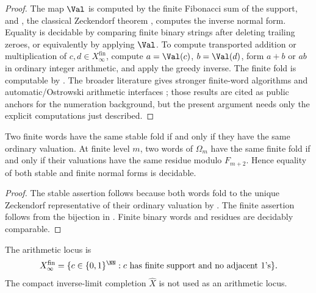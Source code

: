 \begin{proof}
The map \(\Val\) is computed by the finite Fibonacci sum of the support, and
, the classical Zeckendorf theorem
\cite{Zeckendorf1972}, computes the inverse normal form.  Equality is decidable
by comparing finite binary strings after deleting trailing zeroes, or
equivalently by applying \(\Val\).  To compute transported addition or
multiplication of \(c,d\in X_\infty^{\mathrm{fin}}\), compute
\(a=\Val(c)\), \(b=\Val(d)\), form \(a+b\) or \(ab\) in ordinary integer
arithmetic, and apply the greedy inverse.  The finite fold is computable by
.  The broader literature gives
stronger finite-word algorithms and automatic/Ostrowski arithmetic interfaces
\cite{AhlbachEtAl2013,HieronymiTerry2018}; those results are cited as public
anchors for the numeration background, but the present argument needs only the
explicit computations just described.
\end{proof}

\begin{proposition}
\label{prop:fold-confluence}
Two finite words have the same stable fold if and only if they have the same
ordinary valuation.  At finite level \(m\), two words of \(\Omega_m\) have the
same finite fold if and only if their valuations have the same residue modulo
\(F_{m+2}\).  Hence equality of both stable and finite normal forms is decidable.
\end{proposition}

\begin{proof}
The stable assertion follows because both words fold to the unique Zeckendorf
representative of their ordinary valuation by
.  The finite assertion follows from the
bijection in .  Finite binary
words and residues are decidably comparable.
\end{proof}

\begin{definition}[Completions]\label{def:completions}
The arithmetic locus is
\begin{equation}\label{eq:X-infty}
  X_\infty^{\mathrm{fin}}
  =\{c\in\{0,1\}^{\NN}: c\text{ has finite support and no adjacent }1\text{'s}\}.
\end{equation}
The compact inverse-limit completion \(\widehat X\) is not used as an arithmetic
locus.
\end{definition}

